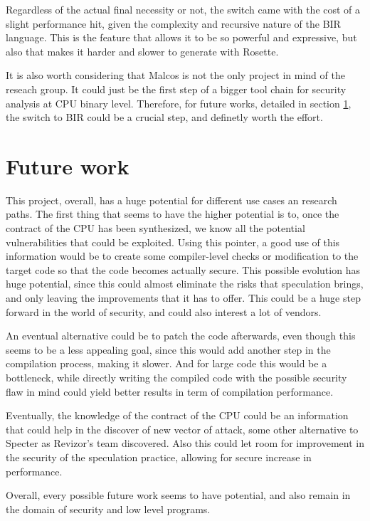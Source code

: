 Regardless of the actual final necessity or not, the switch came with the cost of
a slight performance hit, given the complexity and recursive nature of the BIR
language. This is the feature that allows it to be so powerful and expressive,
but also that makes it harder and slower to generate with Rosette.

It is also worth considering that Malcos is not the only project in mind of the
reseach group. It could just be the first step of a bigger tool chain for security
analysis at CPU binary level. Therefore, for future works, detailed in section
\ref{cha:Future work}, the switch to BIR could be a crucial step, and definetly
worth the effort.

\section{Future work}
\label{cha:Future work} This project, overall, has a huge potential for
different use cases an research paths. The first thing that seems to have the higher
potential is to, once the contract of the CPU has been synthesized, we know all the
potential vulnerabilities that could be exploited. Using this pointer, a good use
of this information would be to create some compiler-level checks or modification
to the target code so that the code becomes actually secure. This possible
evolution has huge potential, since this could almost eliminate the risks that speculation
brings, and only leaving the improvements that it has to offer. This could be a huge
step forward in the world of security, and could also interest a lot of vendors.

An eventual alternative could be to patch the code afterwards, even though this seems
to be a less appealing goal, since this would add another step in the
compilation process, making it slower. And for large code this would be a
bottleneck, while directly writing the compiled code with the possible security flaw
in mind could yield better results in term of compilation performance.

Eventually, the knowledge of the contract of the CPU could be an information
that could help in the discover of new vector of attack, some other alternative to
Specter as Revizor's team discovered. Also this could let room for improvement
in the security of the speculation practice, allowing for secure increase in performance.

Overall, every possible future work seems to have potential, and also remain in the
domain of security and low level programs.